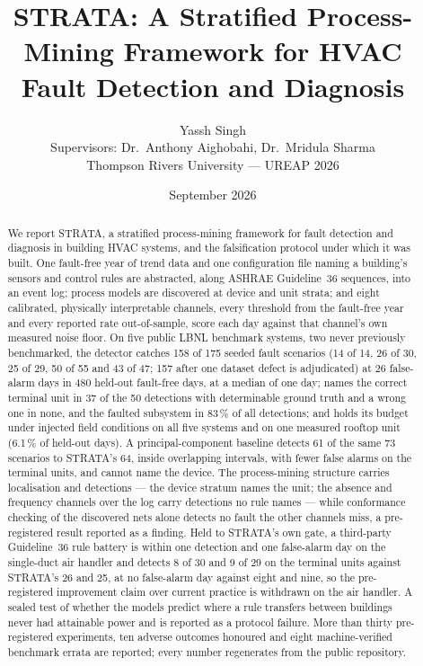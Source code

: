 \documentclass[11pt,letterpaper]{article}
\title{STRATA: A Stratified Process-Mining Framework for HVAC Fault Detection and Diagnosis}
\author{Yassh Singh \\
\small Supervisors: Dr.\ Anthony Aighobahi, Dr.\ Mridula Sharma \\
\small Thompson Rivers University --- UREAP 2026}
\date{September 2026}
\begin{document}
\maketitle

\begin{abstract}
\noindent
We report STRATA, a stratified process-mining framework for fault detection and diagnosis in building HVAC systems, and the falsification protocol under which it was built. One fault-free year of trend data and one configuration file naming a building's sensors and control rules are abstracted, along ASHRAE Guideline~36 sequences, into an event log; process models are discovered at device and unit strata; and eight calibrated, physically interpretable channels, every threshold from the fault-free year and every reported rate out-of-sample, score each day against that channel's own measured noise floor. On five public LBNL benchmark systems, two never previously benchmarked, the detector catches 158 of 175 seeded fault scenarios (14 of 14, 26 of 30, 25 of 29, 50 of 55 and 43 of 47; 157 after one dataset defect is adjudicated) at 26 false-alarm days in 480 held-out fault-free days, at a median of one day; names the correct terminal unit in 37 of the 50 detections with determinable ground truth and a wrong one in none, and the faulted subsystem in 83\,\% of all detections; and holds its budget under injected field conditions on all five systems and on one measured rooftop unit (6.1\,\% of held-out days). A principal-component baseline detects 61 of the same 73 scenarios to STRATA's 64, inside overlapping intervals, with fewer false alarms on the terminal units, and cannot name the device. The process-mining structure carries localisation and detections --- the device stratum names the unit; the absence and frequency channels over the log carry detections no rule names --- while conformance checking of the discovered nets alone detects no fault the other channels miss, a pre-registered result reported as a finding. Held to STRATA's own gate, a third-party Guideline~36 rule battery is within one detection and one false-alarm day on the single-duct air handler and detects 8 of 30 and 9 of 29 on the terminal units against STRATA's 26 and 25, at no false-alarm day against eight and nine, so the pre-registered improvement claim over current practice is withdrawn on the air handler. A sealed test of whether the models predict where a rule transfers between buildings never had attainable power and is reported as a protocol failure. More than thirty pre-registered experiments, ten adverse outcomes honoured and eight machine-verified benchmark errata are reported; every number regenerates from the public repository.
\end{abstract}
\end{document}
